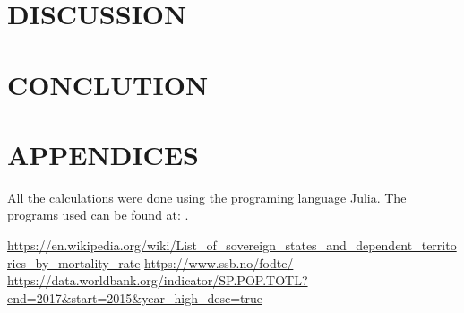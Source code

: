 \documentclass[a4paper]{article}
\let\Oldsection\section
\renewcommand{\section}{\FloatBarrier\Oldsection}
\begin{document}
\section{DISCUSSION}



\section{CONCLUTION}




\section{APPENDICES}
All the calculations were done using the programing language Julia. The programs used can be found at:
\url{}.
	
\begin{thebibliography}{9}
	\url{https://en.wikipedia.org/wiki/List_of_sovereign_states_and_dependent_territories_by_mortality_rate}
	\url{https://www.ssb.no/fodte/}
	\url{https://data.worldbank.org/indicator/SP.POP.TOTL?end=2017&start=2015&year_high_desc=true}
\end{thebibliography}











	
	
	
	
	
	
	
	
	
	
	
	
	
	
	
\end{document}
